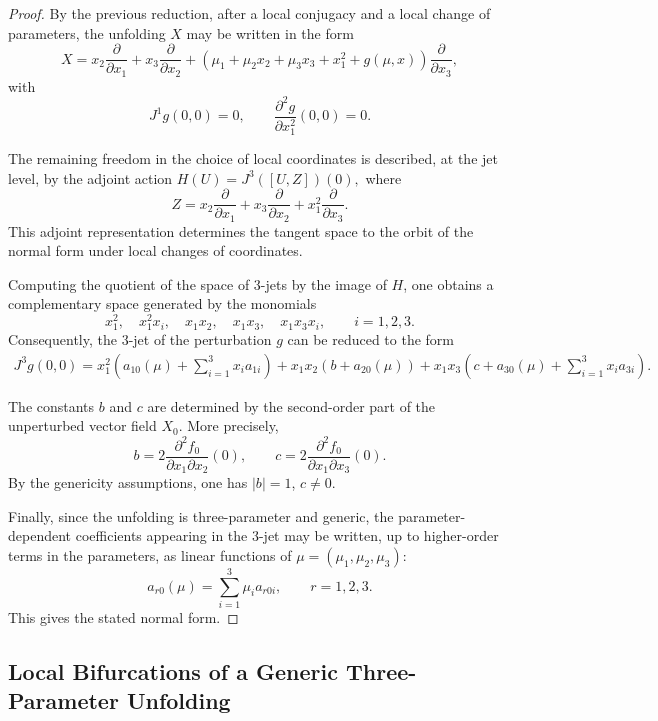 \documentclass[12pt]{article}
\newtheorem{remark definition}{Remark Definition}[section]
\begin{document}
\begin{proof}
	By the previous reduction, after a local conjugacy and a local change of
	parameters, the unfolding $X$ may be written in the form
	$$
	X
	=
	x_2\frac{\partial}{\partial x_1}
	+
	x_3\frac{\partial}{\partial x_2}
	+
	\left(
	\mu_1+\mu_2x_2+\mu_3x_3+x_1^2+g(\mu,x)
	\right)
	\frac{\partial}{\partial x_3},
	$$
	with
	$$
	J^1g(0,0)=0,
	\qquad
	\frac{\partial^2g}{\partial x_1^2}(0,0)=0.
	$$
	
	The remaining freedom in the choice of local coordinates is described, at
	the jet level, by the adjoint action $H(U)=J^3([U,Z])(0),$
	where 
	$$
	Z=x_2\frac{\partial}{\partial x_1}
	+x_3\frac{\partial}{\partial x_2}
	+x_1^2\frac{\partial}{\partial x_3}.
	$$
	This adjoint representation determines the tangent space to the orbit of
	the normal form under local changes of coordinates.
	
	Computing the quotient of the space of $3$-jets by the image of $H$, one
	obtains a complementary space generated by the monomials
	$$
	x_1^2,\quad
	x_1^2x_i,\quad
	x_1x_2,\quad
	x_1x_3,\quad
	x_1x_3x_i,
	\qquad i=1,2,3.
	$$
	Consequently, the $3$-jet of the perturbation $g$ can be reduced to the
	form
	\begin{align*}
		J^3g(0,0)
		=
		x_1^2
		\left(
		a_{10}(\mu)+\sum_{i=1}^3 x_i a_{1i}
		\right)
		+
		x_1x_2
		\left(
		b+a_{20}(\mu)
		\right)
		+
		x_1x_3
		\left(
		c+a_{30}(\mu)+\sum_{i=1}^3 x_i a_{3i}
		\right).
	\end{align*}
	
	The constants $b$ and $c$ are determined by the second-order part of the
	unperturbed vector field $X_0$. More precisely,
	$$
	b
	=
	2\frac{\partial^2 f_0}{\partial x_1\partial x_2}(0),
	\qquad
	c
	=
	2\frac{\partial^2 f_0}{\partial x_1\partial x_3}(0).
	$$
	By the genericity assumptions, one has $|b|=1$, $c\neq 0.$
	
	Finally, since the unfolding is three-parameter and generic, the
	parameter-dependent coefficients appearing in the $3$-jet may be written,
	up to higher-order terms in the parameters, as linear functions of
	$\mu=(\mu_1,\mu_2,\mu_3)$:
	$$
	a_{r0}(\mu)=\sum_{i=1}^3 \mu_i a_{r0i},
	\qquad r=1,2,3.
	$$
	This gives the stated normal form.
\end{proof}
\subsection{Local Bifurcations of a Generic Three-Parameter Unfolding}
\end{document}
